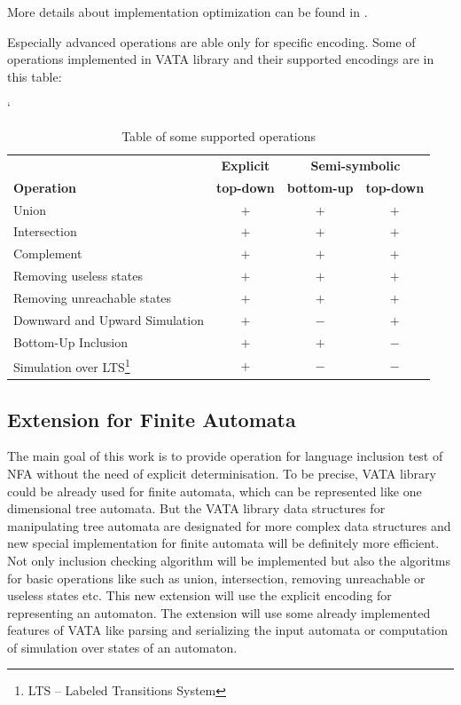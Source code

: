 More details about implementation optimization can be found in \cite{libvata}.

Especially advanced operations are able only for specific encoding. Some of operations implemented in VATA library and their supported encodings are in this table:
\begin{savenotes}
\begin{table}[h]
	\begin{center}
		\catcode`
		\begin{tabular}{| l | c | c | c |} \hline
		& {\textbf{Explicit}} & \multicolumn{2}{|c|}{\textbf{Semi-symbolic}} \\ \cline{2-4}
		\textbf{Operation} & \textbf{top-down} & \textbf{bottom-up} & \textbf{top-down} \\ \hline
		Union & $+$ & $+$ & $+$ \\
		Intersection & $+$ & $+$ & $+$ \\
		Complement & $+$ & $+$ & $+$ \\
		Removing useless states & $+$ & $+$ & $+$ \\
		Removing unreachable states & $+$ & $+$ & $+$ \\
		Downward and Upward Simulation & $+$ & $-$ & $+$ \\
		Bottom-Up Inclusion  & $+$ & $+$ & $-$ \\ 
		Simulation over LTS\footnote{LTS -- Labeled Transitions System} & $+$ & $-$ & $-$ \\ \hline
		\end{tabular}
	\caption{Table of some supported operations}
	\label{tab1}
	\end{center}
\end{table}
\end{savenotes}


\subsection{Extension for Finite Automata}
The main goal of this work is to 
provide operation for language inclusion test of
NFA without the need of explicit determinisation. To be precise, VATA library could be already used for finite automata, 
which can be represented like one dimensional
tree automata. But the VATA library data structures for manipulating tree automata are designated for more complex data structures
and new special implementation for finite
automata will be definitely more efficient. Not only inclusion checking algorithm will be implemented but also the algoritms for basic operations like
such as union, intersection, removing unreachable or useless states etc.
This new extension will use the explicit encoding for representing an automaton. 
The extension will use some already implemented features of VATA like parsing and serializing
the input automata or computation of simulation over states of an automaton.

